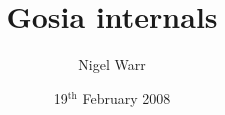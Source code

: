 \documentclass[openany,a4paper]{book}
\begin{document}
\title{Gosia internals}
\author{Nigel Warr}
\date{19$^\textrm{th}$ February 2008}
\maketitle
\tableofcontents\newpage












\end{document}
